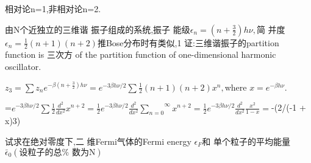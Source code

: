 \documentclass{ctexart}
\begin{document}
相对论n=1,非相对论n=2.

由N个近独立的三维谐%
振子组成的系统,振子%
能级$\epsilon _{n}=\left( n+\frac{3}{2}\right) h\nu ,$简%
并度$\epsilon _{n}=\frac{1}{2}\left( n+1\right) \left(
n+2\right) $推Bose分布时有类似,1%
证:三维谐振子的partition function
is 三次方 of the partition function of one-dimensional
harmonic oscillator.

$z_{3}=\sum z_{n}e^{-\beta \left( n+\frac{3}{2}\right) h\nu }=e^{-3\beta
h\nu /2}\sum \frac{1}{2}\left( n+1\right) \left( n+2\right) x^{n},$where $%
x=e^{-\beta h\nu }.$

=$e^{-3\beta h\nu /2}\sum \frac{1}{2}\frac{d^{2}}{dx^{2}}x^{n+2}=\frac{1}{2}%
e^{-3\beta h\nu /2}\frac{d^{2}}{dx^{2}}\overset{\infty }{\underset{n=0}{\sum 
}}x^{n+2}=\frac{1}{2}e^{-3\beta h\nu /2}\frac{d^{2}}{dx^{2}}\frac{x^{2}}{1-x}%
=$-(2/(-1 + x)3)

\bigskip 

试求在绝对零度下,二%
维Fermi气体的Fermi energy $\epsilon _{F}$和%
单个粒子的平均能量$%
\bar{\epsilon}_{0}\left( \text{设粒子的总%
数为N}\right) $
\end{document}
